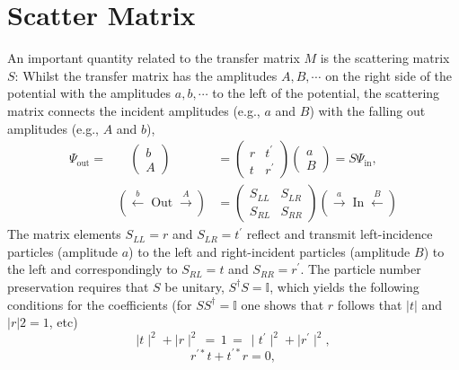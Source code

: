 \section{Scatter Matrix}
An important quantity related to the transfer matrix $M$ is the scattering matrix $S$: Whilst the transfer matrix has the amplitudes $A, B,\cdots $ on the right side of the potential with the amplitudes $a, b,\cdots$ to the left of the potential, the scattering matrix connects the incident amplitudes (e.g., $a$ and $B$) with the falling out amplitudes (e.g., $A$ and $b$),
\begin{equation}
\begin{aligned} 
\Psi_{\mathrm{out}}=&\quad
    \left(\begin{array}{c}{b} \\ {A}\end{array}\right) &=\left(\begin{array}{cc}{r} & {t^{\prime}} \\ {t} & {r^{\prime}}\end{array}\right)\left(\begin{array}{c}{a} \\ {B}\end{array}\right)=S \Psi_{\mathrm{in}} ,
\\ & (\stackrel{b}{\leftarrow} \operatorname{Out} \stackrel{A}{\rightarrow})&=\left(\begin{array}{cc}{S_{L L}} & {S_{L R}} 
\\ {S_{R L}} & {S_{R R}}\end{array}\right)(\stackrel{a}{\rightarrow} \operatorname{In} \stackrel{B}{\leftarrow}) 
\end{aligned}
\end{equation}
The matrix elements $S_{LL} = r$ and $S_{LR} = t^{\prime}$ reflect and transmit left-incidence particles (amplitude $a$) to the left and right-incident particles (amplitude $B$) to the left and correspondingly to $S_{RL} = t$ and $S_{RR} = r^{\prime}$. The particle number preservation requires that $S$ be unitary, $S^{\dagger}S = \mathbb{I}$, which yields the following conditions for the coefficients (for $SS^{\dagger} = \mathbb{I}$ one shows that $r$ follows that $| t |$ and $| r | 2 = 1$, etc)
\begin{equation}
    \mid t\mid^2 + \mid r\mid^2 \,= \, 1 \,= \,\mid t^{\prime}\mid^2 + \mid r^{\prime}\mid^2,
\end{equation}
\begin{equation}
    r^{\prime *}t+t^{\prime *}r = 0,
\end{equation}
